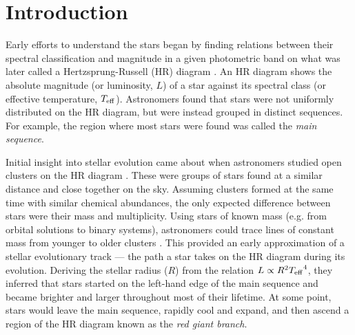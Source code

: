 %
%
%
%
%
\chapter{Introduction}



Early efforts to understand the stars began by finding relations between their spectral classification and magnitude in a given photometric band on what was later called a Hertzsprung-Russell (HR) diagram \citep[e.g.][]{Russell1914}. An HR diagram shows the absolute magnitude (or luminosity, \(L\)) of a star against its spectral class (or effective temperature, \({T_\mathrm{eff}}\)). Astronomers found that stars were not uniformly distributed on the HR diagram, but were instead grouped in distinct sequences. For example, the region where most stars were found was called the \emph{main sequence}.

Initial insight into stellar evolution came about when astronomers studied open clusters on the HR diagram \needcite. These were groups of stars found at a similar distance and close together on the sky. Assuming clusters formed at the same time with similar chemical abundances, the only expected difference between stars were their mass and multiplicity. Using stars of known mass (e.g. from orbital solutions to binary systems), astronomers could trace lines of constant mass from younger to older clusters \needcite. This provided an early approximation of a stellar evolutionary track --- the path a star takes on the HR diagram during its evolution. Deriving the stellar radius (\(R\)) from the relation \(L \propto R^2 {T_\mathrm{eff}}^4\), they inferred that stars started on the left-hand edge of the main sequence and became brighter and larger throughout most of their lifetime. At some point, stars would leave the main sequence, rapidly cool and expand, and then ascend a region of the HR diagram known as the \emph{red giant branch}.

